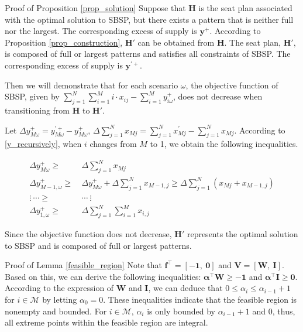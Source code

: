 \begin{pf}{Proof of Proposition \ref{prop_solution}}
Suppose that $\bm{H}$ is the seat plan associated with the optimal solution to SBSP, but there exists a pattern that is neither full nor the largest. The corresponding excess of supply is $\mathbf{y}^{+}$. According to Proposition \ref{prop_construction}, $\bm{H}{'}$ can be obtained from $\bm{H}$. The seat plan, $\bm{H}{'}$, is composed of full or largest patterns and satisfies all constraints of SBSP. The corresponding excess of supply is $\mathbf{y}^{'+}$.

Then we will demonstrate that for each scenario $\omega$, the objective function of SBSP, given by $\sum_{j =1}^{N} \sum_{i=1}^M i \cdot x_{ij} - \sum_{i = 1}^{M} y_{i \omega}^{+}$, does not decrease when transitioning from $\bm{H}$ to $\bm{H}{'}$.

Let $\Delta y_{M \omega}^{+} = y_{M \omega}^{'+} - y_{M \omega}^{+}$, $\Delta \sum_{j=1}^{N} x_{Mj} = \sum_{j=1}^{N} x_{Mj}^{'} - \sum_{j=1}^{N} x_{Mj}$. According to \eqref{y_recursively}, when $i$ changes from $M$ to 1, we obtain the following inequalities.

\begin{align*}
  \Delta y_{M \omega}^{+} \geq &~ \Delta \sum_{j=1}^{N} x_{Mj} \\
  \Delta y_{M-1, \omega}^{+} \geq &~ \Delta y_{M \omega}^{+} + \Delta \sum_{j=1}^{N} x_{M-1,j} \geq \Delta \sum_{j=1}^{N} (x_{Mj} + x_{M-1,j}) \\
  \vdots ~\cdots \geq & ~\cdots ~\vdots \\
  \Delta y_{1, \omega}^{+} \geq &~ \Delta \sum_{j=1}^{N} \sum_{i=1}^{M} x_{i,j}
\end{align*}

Since the objective function does not decrease, $\bm{H}{'}$ represents the optimal solution to SBSP and is composed of full or largest patterns.
\end{pf}

\begin{pf}{Proof of Lemma \ref{feasible_region}}
Note that $\mathbf{f}^{\intercal} = [-\mathbf{1},~\mathbf{0}]$ and $\mathbf{V} = [\mathbf{W},~\mathbf{I}]$. Based on this, we can derive the following inequalities: $\bm{\alpha}^{\intercal} \mathbf{W} \geq -\mathbf{1}$ and $\bm{\alpha}^{\intercal} \mathbf{I} \geq \mathbf{0}$. According to the expression of $\mathbf{W}$ and $\mathbf{I}$, we can deduce that $0 \leq \alpha_i \leq \alpha_{i-1} +1$ for $i \in \mathcal{M}$ by letting $\alpha_0 = 0$. These inequalities indicate that the feasible region is nonempty and bounded. For $i \in \mathcal{M}$, $\alpha_{i}$ is only bounded by $\alpha_{i-1}+1$ and $0$, thus, all extreme points within the feasible region are integral.
\end{pf}

